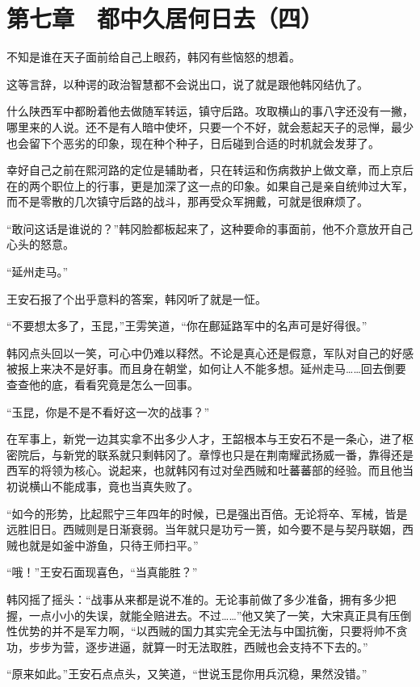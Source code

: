 \section{第七章　都中久居何日去（四）}

不知是谁在天子面前给自己上眼药，韩冈有些恼怒的想着。

这等言辞，以种谔的政治智慧都不会说出口，说了就是跟他韩冈结仇了。

什么陕西军中都盼着他去做随军转运，镇守后路。攻取横山的事八字还没有一撇，哪里来的人说。还不是有人暗中使坏，只要一个不好，就会惹起天子的忌惮，最少也会留下个恶劣的印象，现在种个种子，日后碰到合适的时机就会发芽了。

幸好自己之前在熙河路的定位是辅助者，只在转运和伤病救护上做文章，而上京后在的两个职位上的行事，更是加深了这一点的印象。如果自己是亲自统帅过大军，而不是零散的几次镇守后路的战斗，那再受众军拥戴，可就是很麻烦了。

“敢问这话是谁说的？”韩冈脸都板起来了，这种要命的事面前，他不介意放开自己心头的怒意。

“延州走马。”

王安石报了个出乎意料的答案，韩冈听了就是一怔。

“不要想太多了，玉昆，”王雱笑道，“你在鄜延路军中的名声可是好得很。”

韩冈点头回以一笑，可心中仍难以释然。不论是真心还是假意，军队对自己的好感被报上来决不是好事。而且身在朝堂，如何让人不能多想。延州走马……回去倒要查查他的底，看看究竟是怎么一回事。

“玉昆，你是不是不看好这一次的战事？”

在军事上，新党一边其实拿不出多少人才，王韶根本与王安石不是一条心，进了枢密院后，与新党的联系就只剩韩冈了。章惇也只是在荆南耀武扬威一番，靠得还是西军的将领为核心。说起来，也就韩冈有过对垒西贼和吐蕃蕃部的经验。而且他当初说横山不能成事，竟也当真失败了。

“如今的形势，比起熙宁三年四年的时候，已是强出百倍。无论将卒、军械，皆是远胜旧日。西贼则是日渐衰弱。当年就只是功亏一篑，如今要不是与契丹联姻，西贼也就是如釜中游鱼，只待王师扫平。”

“哦！”王安石面现喜色，“当真能胜？”

韩冈摇了摇头：“战事从来都是说不准的。无论事前做了多少准备，拥有多少把握，一点小小的失误，就能全赔进去。不过……”他又笑了一笑，大宋真正具有压倒性优势的并不是军力啊，“以西贼的国力其实完全无法与中国抗衡，只要将帅不贪功，步步为营，逐步进逼，就算一时无法取胜，西贼也会支持不下去的。”

“原来如此。”王安石点点头，又笑道，“世说玉昆你用兵沉稳，果然没错。”

